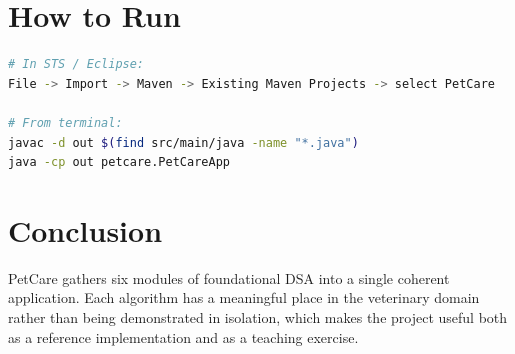 \documentclass[11pt,a4paper]{article}
\begin{document}
\section{How to Run}
\begin{lstlisting}[language=bash,frame=single]
# In STS / Eclipse:
File -> Import -> Maven -> Existing Maven Projects -> select PetCare

# From terminal:
javac -d out $(find src/main/java -name "*.java")
java -cp out petcare.PetCareApp
\end{lstlisting}

\section{Conclusion}
PetCare gathers six modules of foundational DSA into a single coherent
application. Each algorithm has a meaningful place in the veterinary
domain rather than being demonstrated in isolation, which makes the
project useful both as a reference implementation and as a teaching
exercise.
\end{document}
